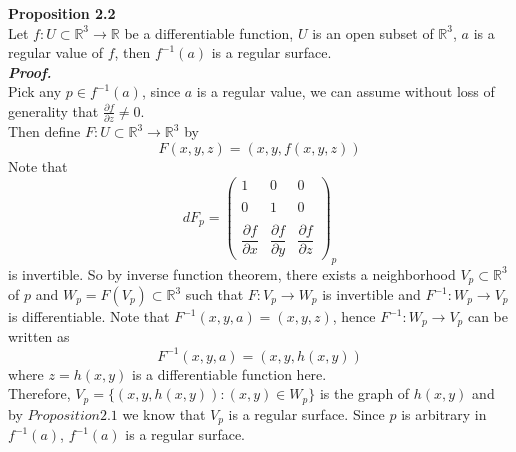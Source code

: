 \documentclass{article}
\begin{document}
\par
\textbf{Proposition 2.2}\\
Let $f: U \subset \mathbb{R}^3 \to \mathbb{R}$ be a differentiable function, $U$ is an open subset of $\mathbb{R}^3$, $a$ is a regular
value of $f$, then $f^{-1}(a)$ is a regular surface.\\
\textbf{\textit{Proof.}}\\
Pick any $p \in f^{-1}(a)$, since $a$ is a regular value, we can assume without loss of generality that $\frac{\partial f}{\partial z} \neq 0$.\\
Then define $F: U \subset \mathbb{R}^3 \to \mathbb{R}^3$ by
$$
    F(x,y,z) = (x, y, f(x,y,z))
$$
Note that
$$
    dF_p = 
    \left(\begin{array}{ccc}
        1 & 0 & 0 \\\\
        0 & 1 & 0 \\\\
        \dfrac{\partial f}{\partial x} & \dfrac{\partial f}{\partial y} & \dfrac{\partial f}{\partial z}
    \end{array}\right)_p
$$
is invertible. So by inverse function theorem, there exists a neighborhood $V_p \subset \mathbb{R}^3$ of $p$
and $W_p = F(V_p) \subset \mathbb{R}^3$ such that
$F: V_p \to W_p$ is invertible and $F^{-1}: W_p \to V_p$ is differentiable. Note that $F^{-1}(x,y,a)=(x,y,z)$,
hence $F^{-1}: W_p \to V_p$ can be written as
$$
    F^{-1}(x,y,a) = (x,y,h(x,y))
$$
where $z=h(x,y)$ is a differentiable function here.\\
Therefore, $V_p = \{(x,y,h(x,y)): (x,y) \in W_p\}$ is the graph of $h(x,y)$ and by $Proposition 2.1$ we know that
$V_p$ is a regular surface. Since $p$ is arbitrary in $f^{-1}(a)$, $f^{-1}(a)$ is a regular surface. \qedsymbol
\end{document}
